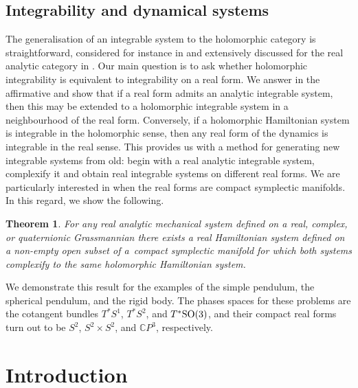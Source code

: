 \documentclass[pdftex]{sigma}
\numberwithin{equation}{section}
\newtheorem*{Theorem*}{Theorem}
\newcommand{\CP}{\mathbb{C}P}
\begin{document}
\subsection{Integrability and dynamical systems}

The generalisation of an integrable system to the holomorphic category is straightforward, considered for instance in \cite{pcrook} and extensively discussed for the real analytic category in \cite{Moerbeke, realm}. Our main question is to ask whether holomorphic integrability is equivalent to integrability on a real form. We answer in the affirmative and show that if a real form admits an analytic integrable system, then this may be extended to a holomorphic integrable system in a neighbourhood of the real form. Conversely, if a holomorphic Hamiltonian system is integrable in the holomorphic sense, then any real form of the dynamics is integrable in the real sense. This provides us with a method for generating new integrable systems from old: begin with a real analytic integrable system, complexify it and obtain real integrable systems on different real forms. We are particularly interested in when the real forms are compact symplectic manifolds. In this regard, we show the following.
\begin{Theorem*}
For any real analytic mechanical system defined on a real, complex, or quaternionic Grassmannian there exists a real Hamiltonian system defined on a non-empty open subset of a~compact symplectic manifold for which both systems complexify to the same holomorphic Hamiltonian system.
\end{Theorem*}
We demonstrate this result for the examples of the simple pendulum, the spherical pendulum, and the rigid body. The phases spaces for these problems are the cotangent bundles $T^*S^1$, $T^*S^2$, and $T^*{\rm SO}(3)$, and their compact real forms turn out to be $S^2$, $S^2\times S^2$, and $\CP^3$, respectively.

\section{Introduction}
\end{document}
